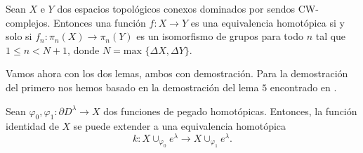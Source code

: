 \begin{theorem}
\label{dominados}
    Sean $X$ e $Y$ dos espacios topológicos conexos dominados por sendos CW-complejos. Entonces una función $f:X\to Y$ es una equivalencia homotópica si y solo si $f_n:\pi_n(X)\to \pi_n(Y)$ es un isomorfismo de grupos para todo $n$ tal que $1\le n<N+1$, donde $N=\text{max } \{\Delta X,\Delta Y\}$.
\end{theorem}

\bigskip

Vamos ahora con los dos lemas, ambos con demostración. Para la demostración del primero nos hemos basado en la demostración del lema $5$ encontrado en \cite[p.~67]{whitehead_lemacw}.

\begin{lemma}
\label{lema1_democwvariedad}
    Sean $\varphi_0, \varphi_1: \partial D^{\lambda} \to X$ dos funciones de pegado homotópicas. Entonces, la función identidad de $X$ se puede extender a una equivalencia homotópica
    \begin{equation*}
        k: X\cup_{\varphi_0} e^{\lambda} \to X\cup_{\varphi_1} e^{\lambda}.
    \end{equation*}
\end{lemma}
